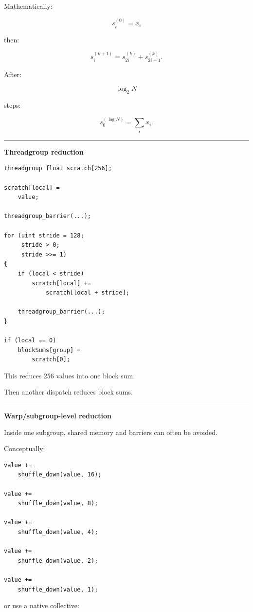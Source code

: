 Mathematically:

\[
s^{(0)}_i=x_i
\]

then:

\[
s^{(k+1)}_i
=
s^{(k)}_{2i}
+
s^{(k)}_{2i+1}.
\]

After:

\[
\log_2N
\]

steps:

\[
s^{(\log N)}_0
=
\sum_i x_i.
\]

\begin{center}\rule{0.5\linewidth}{0.5pt}\end{center}

\textbf{Threadgroup reduction}

\protect{}\label{zq2h7f}%
\begin{verbatim}
threadgroup float scratch[256];

scratch[local] =
    value;

threadgroup_barrier(...);

for (uint stride = 128;
     stride > 0;
     stride >>= 1)
{
    if (local < stride)
        scratch[local] +=
            scratch[local + stride];

    threadgroup_barrier(...);
}

if (local == 0)
    blockSums[group] =
        scratch[0];
\end{verbatim}

This reduces 256 values into one block sum.

Then another dispatch reduces block sums.

\begin{center}\rule{0.5\linewidth}{0.5pt}\end{center}

\textbf{Warp/subgroup-level reduction}

Inside one subgroup, shared memory and barriers can often be avoided.

Conceptually:

\protect{}\label{ywrrrk}%
\begin{verbatim}
value +=
    shuffle_down(value, 16);

value +=
    shuffle_down(value, 8);

value +=
    shuffle_down(value, 4);

value +=
    shuffle_down(value, 2);

value +=
    shuffle_down(value, 1);
\end{verbatim}

or use a native collective:

